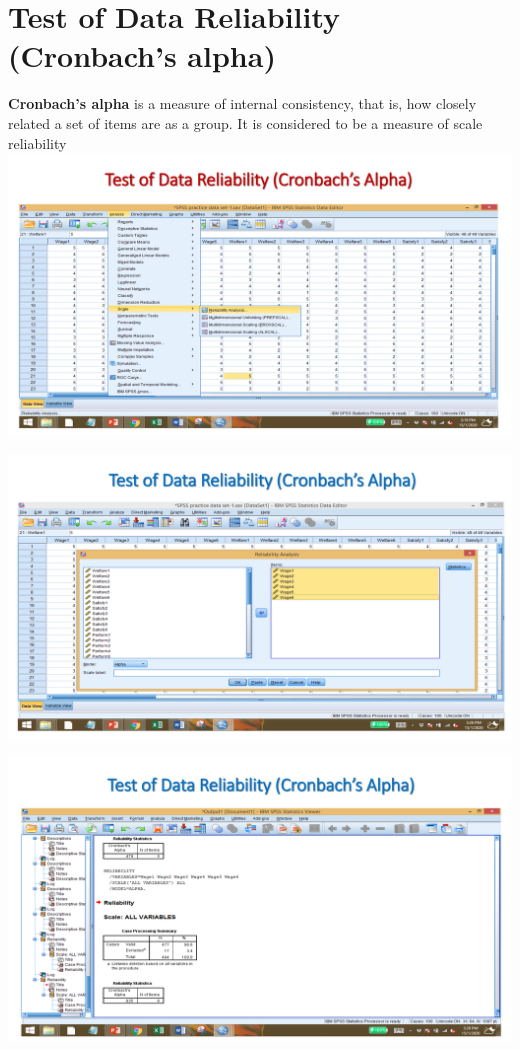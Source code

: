 \documentclass[
  letterpaper,
  DIV=11,
  numbers=noendperiod]{scrreprt}
\begin{document}

\chapter{Test of Data Reliability (Cronbach's
alpha)}\label{test-of-data-reliability-cronbachs-alpha}

\textbf{Cronbach's alpha} is a measure of internal consistency, that is,
how closely related a set of items are as a group. It is considered to
be a measure of scale reliability\\

\includegraphics{images/slides/img_Page_059.png}

\includegraphics{images/slides/img_Page_060.png}

\includegraphics{images/slides/img_Page_061.png}
\end{document}
